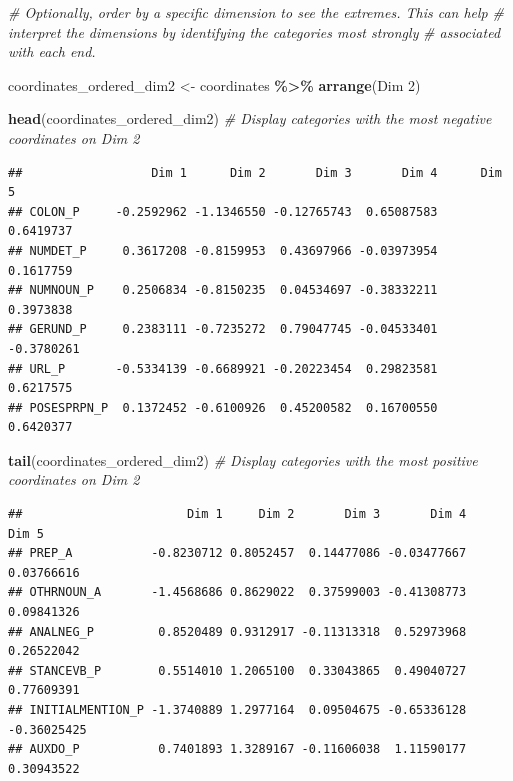 \documentclass[
]{book}
\newenvironment{Shaded}{\begin{snugshade}}{\end{snugshade}}
\newcommand{\AttributeTok}[1]{\textcolor[rgb]{0.13,0.29,0.53}{#1}}
\newcommand{\CommentTok}[1]{\textcolor[rgb]{0.56,0.35,0.01}{\textit{#1}}}
\newcommand{\FunctionTok}[1]{\textcolor[rgb]{0.13,0.29,0.53}{\textbf{#1}}}
\newcommand{\NormalTok}[1]{#1}
\newcommand{\OtherTok}[1]{\textcolor[rgb]{0.56,0.35,0.01}{#1}}
\newcommand{\SpecialCharTok}[1]{\textcolor[rgb]{0.81,0.36,0.00}{\textbf{#1}}}
\newcommand{\StringTok}[1]{\textcolor[rgb]{0.31,0.60,0.02}{#1}}
\begin{document}
\begin{Shaded}
\begin{Highlighting}[]
\CommentTok{\# Optionally, order by a specific dimension to see the extremes. This can help}
\CommentTok{\# interpret the dimensions by identifying the categories most strongly}
\CommentTok{\# associated with each end.}

\NormalTok{coordinates\_ordered\_dim2 }\OtherTok{\textless{}{-}}\NormalTok{ coordinates }\SpecialCharTok{\%\textgreater{}\%}
    \FunctionTok{arrange}\NormalTok{(}\StringTok{\textasciigrave{}}\AttributeTok{Dim 2}\StringTok{\textasciigrave{}}\NormalTok{)}

\FunctionTok{head}\NormalTok{(coordinates\_ordered\_dim2)  }\CommentTok{\# Display categories with the most negative coordinates on Dim 2}
\end{Highlighting}
\end{Shaded}

\begin{verbatim}
##                  Dim 1      Dim 2       Dim 3       Dim 4      Dim 5
## COLON_P     -0.2592962 -1.1346550 -0.12765743  0.65087583  0.6419737
## NUMDET_P     0.3617208 -0.8159953  0.43697966 -0.03973954  0.1617759
## NUMNOUN_P    0.2506834 -0.8150235  0.04534697 -0.38332211  0.3973838
## GERUND_P     0.2383111 -0.7235272  0.79047745 -0.04533401 -0.3780261
## URL_P       -0.5334139 -0.6689921 -0.20223454  0.29823581  0.6217575
## POSESPRPN_P  0.1372452 -0.6100926  0.45200582  0.16700550  0.6420377
\end{verbatim}

\begin{Shaded}
\begin{Highlighting}[]
\FunctionTok{tail}\NormalTok{(coordinates\_ordered\_dim2)  }\CommentTok{\# Display categories with the most positive coordinates on Dim 2}
\end{Highlighting}
\end{Shaded}

\begin{verbatim}
##                       Dim 1     Dim 2       Dim 3       Dim 4       Dim 5
## PREP_A           -0.8230712 0.8052457  0.14477086 -0.03477667  0.03766616
## OTHRNOUN_A       -1.4568686 0.8629022  0.37599003 -0.41308773  0.09841326
## ANALNEG_P         0.8520489 0.9312917 -0.11313318  0.52973968  0.26522042
## STANCEVB_P        0.5514010 1.2065100  0.33043865  0.49040727  0.77609391
## INITIALMENTION_P -1.3740889 1.2977164  0.09504675 -0.65336128 -0.36025425
## AUXDO_P           0.7401893 1.3289167 -0.11606038  1.11590177  0.30943522
\end{verbatim}
\end{document}
